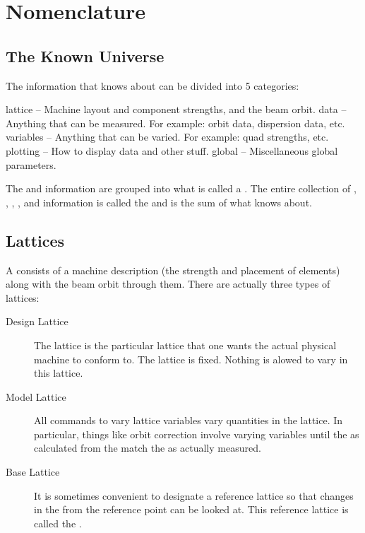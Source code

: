 \chapter{Nomenclature}
\label{c:nomenclature}

\section{The Known Universe}

The information that \tao knows about can be divided into 5 categories: 
\begin{example}
  lattice   -- Machine layout and component strengths, and the beam orbit.
  data      -- Anything that can be measured. For example: orbit data, dispersion data, etc.
  variables -- Anything that can be varied. For example: quad strengths, etc.
  plotting  -- How to display data and other stuff.
  global    -- Miscellaneous global parameters.
\end{example}
The  and  information are grouped into what is called a
. The entire collection of , ,
, , and  information is called
the  and is the sum of what \tao knows about.

\section{Lattices}

A  consists of a machine description (the strength and placement of elements)
along with the beam orbit through them. There are actually three types of lattices:
  \vspace*{-3ex}
  \begin{description}
  \item[Design Lattice] \Newline 
The  lattice is the particular lattice that one wants the
actual physical machine to conform to. The  lattice is fixed. Nothing is
alowed to vary in this lattice.
  \item[Model Lattice] \Newline
All \tao commands to vary lattice variables vary quantities in the
 lattice. In particular, things like orbit correction
involve varying  variables until the  as calculated
from the  match the  as actually measured.
  \item[Base Lattice] \Newline
It is sometimes convenient to designate a reference lattice so that
changes in the  from the reference point can be looked at.
This reference lattice is called the .
  \end{description}

